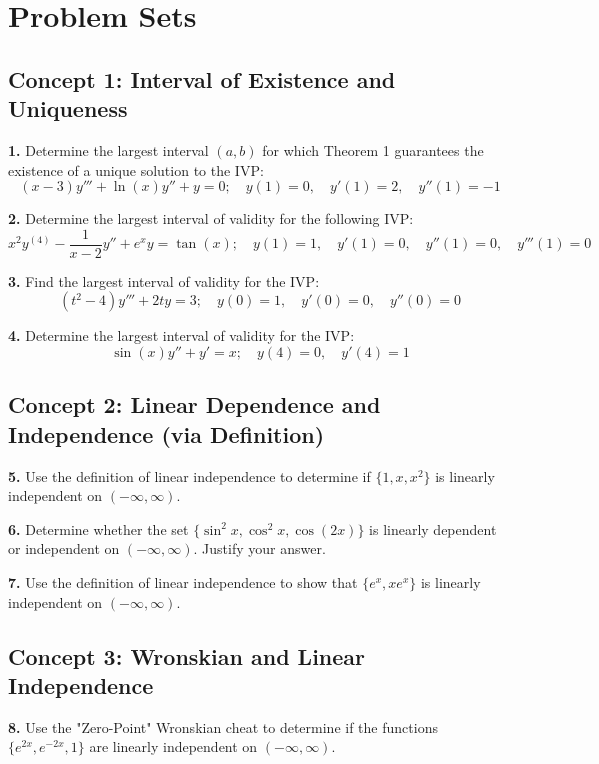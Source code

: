 \documentclass[12pt]{article}
\begin{document}
\newpage

\section{Problem Sets}

\subsection*{Concept 1: Interval of Existence and Uniqueness}
\textbf{1.} Determine the largest interval $(a, b)$ for which Theorem 1 guarantees the existence of a unique solution to the IVP:
$$(x-3)y''' + \ln(x)y'' + y = 0; \quad y(1)=0, \quad y'(1)=2, \quad y''(1)=-1$$

\textbf{2.} Determine the largest interval of validity for the following IVP:
$$x^2 y^{(4)} - \frac{1}{x-2} y'' + e^x y = \tan(x); \quad y(1)=1, \quad y'(1)=0, \quad y''(1)=0, \quad y'''(1)=0$$

\textbf{3.} Find the largest interval of validity for the IVP:
$$(t^2-4)y''' + 2ty = 3; \quad y(0)=1, \quad y'(0)=0, \quad y''(0)=0$$

\textbf{4.} Determine the largest interval of validity for the IVP:
$$\sin(x)y'' + y' = x; \quad y(4)=0, \quad y'(4)=1$$

\subsection*{Concept 2: Linear Dependence and Independence (via Definition)}
\textbf{5.} Use the definition of linear independence to determine if $\{1, x, x^2\}$ is linearly independent on $(-\infty, \infty)$.

\textbf{6.} Determine whether the set $\{\sin^2 x, \cos^2 x, \cos(2x)\}$ is linearly dependent or independent on $(-\infty, \infty)$. Justify your answer.

\textbf{7.} Use the definition of linear independence to show that $\{e^x, xe^x\}$ is linearly independent on $(-\infty, \infty)$.

\subsection*{Concept 3: Wronskian and Linear Independence}
\textbf{8.} Use the "Zero-Point" Wronskian cheat to determine if the functions $\{e^{2x}, e^{-2x}, 1\}$ are linearly independent on $(-\infty, \infty)$.
\end{document}
